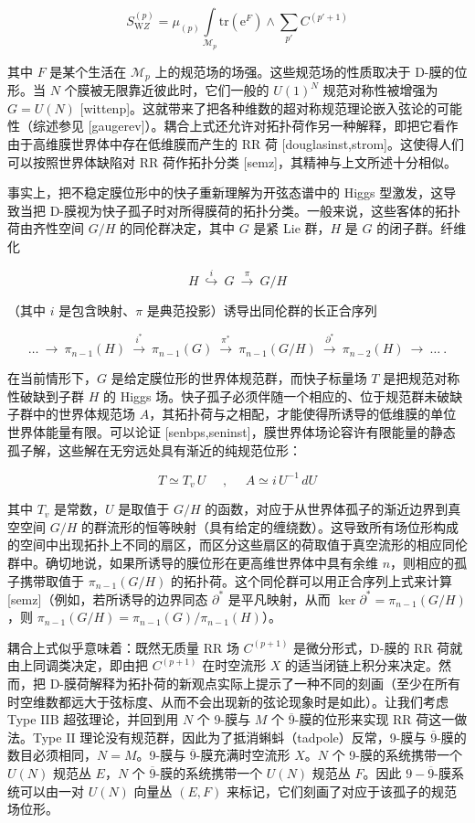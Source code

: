 \documentclass[11pt,a4paper]{ctexart}
\begin{document}
\[S_{\mathrm WZ}^{(p)}=\mu_{(p)}\int\limits_{{\mathcal M}_p}\mathrm{tr}\left(\mbox{e}^F\right)\wedge\sum_{p'} C^{(p'+1)}\]

其中 \(F\) 是某个生活在 \({\mathcal M}_p\) 上的规范场的场强。这些规范场的性质取决于 D-膜的位形。当 \(N\) 个膜被无限靠近彼此时，它们一般的 \(U(1)^N\) 规范对称性被增强为 \(G=U(N)\) [wittenp]。这就带来了把各种维数的超对称规范理论嵌入弦论的可能性（综述参见 [gaugerev]）。耦合上式还允许对拓扑荷作另一种解释，即把它看作由于高维膜世界体中存在低维膜而产生的 RR 荷 [douglasinst,strom]。这使得人们可以按照世界体缺陷对 RR 荷作拓扑分类 [semz]，其精神与上文所述十分相似。

事实上，把不稳定膜位形中的快子重新理解为开弦态谱中的 Higgs 型激发，这导致当把 D-膜视为快子孤子时对所得膜荷的拓扑分类。一般来说，这些客体的拓扑荷由齐性空间 \(G/H\) 的同伦群决定，其中 \(G\) 是紧 Lie 群，\(H\) 是 \(G\) 的闭子群。纤维化

\[H~\stackrel{i}{\hookrightarrow}~G~\stackrel{\pi}{\longrightarrow}~G/H\]

（其中 \(i\) 是包含映射、\(\pi\) 是典范投影）诱导出同伦群的长正合序列

\[\dots~\longrightarrow~\pi_{n-1}(H)~{\stackrel{i^*}{\longrightarrow}}~
\pi_{n-1}(G)~{\stackrel{\pi^*}{\longrightarrow}}~\pi_{n-1}(G/H)~{\stackrel{\partial^*}{\longrightarrow}}~\pi_{n-2}(H)~\longrightarrow~\dots \ .\]

在当前情形下，\(G\) 是给定膜位形的世界体规范群，而快子标量场 \(T\) 是把规范对称性破缺到子群 \(H\) 的 Higgs 场。快子孤子必须伴随一个相应的、位于规范群未破缺子群中的世界体规范场 \(A\)，其拓扑荷与之相配，才能使得所诱导的低维膜的单位世界体能量有限。可以论证 [senbps,seninst]，膜世界体场论容许有限能量的静态孤子解，这些解在无穷远处具有渐近的纯规范位形：

\[T\simeq T_v\,U~~~~~~,~~~~~~A\simeq i\,U^{-1}\,dU\]

其中 \(T_v\) 是常数，\(U\) 是取值于 \(G/H\) 的函数，对应于从世界体孤子的渐近边界到真空空间 \(G/H\) 的群流形的恒等映射（具有给定的缠绕数）。这导致所有场位形构成的空间中出现拓扑上不同的扇区，而区分这些扇区的荷取值于真空流形的相应同伦群中。确切地说，如果所诱导的膜位形在更高维世界体中具有余维 \(n\)，则相应的孤子携带取值于 \(\pi_{n-1}(G/H)\) 的拓扑荷。这个同伦群可以用正合序列上式来计算 [semz]（例如，若所诱导的边界同态 \(\partial^*\) 是平凡映射，从而 \(\ker\partial^*=\pi_{n-1}(G/H)\)，则 \(\pi_{n-1}(G/H)=\pi_{n-1}(G)/\pi_{n-1}(H)\)）。

耦合上式似乎意味着：既然无质量 RR 场 \(C^{(p+1)}\) 是微分形式，D-膜的 RR 荷就由上同调类决定，即由把 \(C^{(p+1)}\) 在时空流形 \(X\) 的适当闭链上积分来决定。然而，把 D-膜荷解释为拓扑荷的新观点实际上提示了一种不同的刻画（至少在所有时空维数都远大于弦标度、从而不会出现新的弦论现象时是如此）。让我们考虑 Type IIB 超弦理论，并回到用 \(N\) 个 9-膜与 \(M\) 个 \(\overline{9}\)-膜的位形来实现 RR 荷这一做法。Type II 理论没有规范群，因此为了抵消蝌蚪（tadpole）反常，9-膜与 \(\overline{9}\)-膜的数目必须相同，\(N=M\)。9-膜与 \(\overline{9}\)-膜充满时空流形 \(X\)。\(N\) 个 9-膜的系统携带一个 \(U(N)\) 规范丛 \(E\)，\(N\) 个 \(\overline{9}\)-膜的系统携带一个 \(U(N)\) 规范丛 \(F\)。因此 \(9-\overline{9}\)-膜系统可以由一对 \(U(N)\) 向量丛 \((E,F)\) 来标记，它们刻画了对应于该孤子的规范场位形。
\end{document}
